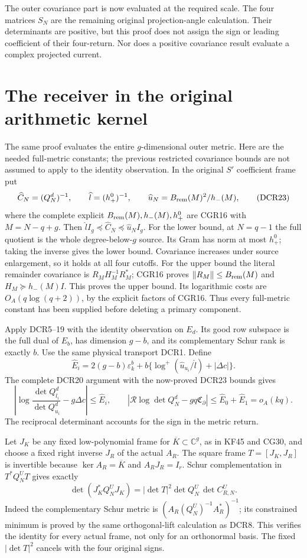 \documentclass[11pt]{article}
\newcommand{\C}{\mathbb C}
\newcommand{\lp}{\log^+}
\begin{document}
The outer covariance part is now evaluated at the required scale.
The four matrices \(S_N\) are the remaining original projection-angle
calculation. Their determinants are positive, but this proof does
not assign the sign or leading coefficient of their four-return.
Nor does a positive covariance result evaluate a complex projected
current.

\section{The receiver in the original arithmetic kernel}

The same proof evaluates the entire \(g\)-dimensional outer metric.
Here are the needed full-metric constants; the previous restricted
covariance bounds are not assumed to apply to the identity observation.
In the original \(S'\) coefficient frame put
\[
\widehat C_N=(Q_N^d)^{-1},\qquad
\widehat l=(h_+^0)^{-1},\qquad
\widehat u_N=B_{\rm rem}(M)^2/h_-(M),
\tag{DCR23}
\]
where the complete explicit \(B_{\rm rem}(M),h_-(M),h_+^0\)
are CGR16 with \(M=N-q+g\). Then
\(\widehat l I_g\preceq\widehat C_N
\preceq\widehat u_N I_g\).
For the lower bound, at \(N=q-1\) the full quotient is the whole
degree-below-\(g\) source. Its Gram has norm at most \(h_+^0\);
taking the inverse gives the lower bound. Covariance increases
under source enlargement, so it holds at all four cutoffs.
For the upper bound the literal remainder covariance is
\(R_MH_M^{-1}R_M^*\); CGR16 proves
\(\|R_M\|\le B_{\rm rem}(M)\) and \(H_M\succeq h_-(M)I\).
This proves the upper bound. Its logarithmic costs are
\(O_A(q\log(q+2))\), by the explicit factors of CGR16.
Thus every full-metric constant has been supplied before deleting
a primary component.

Apply DCR5--19 with the identity observation on \(E_d\).
Its good row subspace is the full dual of \(E_b\), has dimension
\(g-b\), and its complementary Schur rank is exactly \(b\).
Use the same physical transport DCR1. Define
\[
\widehat E_i=
 2(g-b)\varepsilon_k^b+
 b\{\lp(\widehat u_{u_i}/\widehat l)+|\Delta c|\}.
\]
The complete DCR20 argument with the now-proved DCR23 bounds gives
\[
\left|\log\frac{\det Q_{l_i}^d}{\det Q_{u_i}^d}
                         -g\Delta c\right|\le\widehat E_i,
\qquad
\left|\mathcal R\log\det Q_N^d-gq\mathfrak C_\partial\right|
 \le\widehat E_0+\widehat E_1=o_A(kq).
\tag{DCR24}
\]
The reciprocal determinant accounts for the sign in the metric return.

Let \(J_K\) be any fixed low-polynomial frame for
\(\overline K\subset\C^g\), as in KF45 and CG30, and choose a
fixed right inverse \(J_R\) of the actual \(A_R\).
The square frame \(T=[J_K,J_R]\) is invertible because
\(\ker A_R=\overline K\) and \(A_RJ_R=I_r\).
Schur complementation in \(T^*Q_N^UT\) gives exactly
\[
 \det(J_K^*Q_N^UJ_K)
   =|\det T|^2\det Q_N^U\,\det C_{R,N}^U .
\tag{DCR25}
\]
Indeed the complementary Schur metric is
\((A_R(Q_N^U)^{-1}A_R^*)^{-1}\); its constrained minimum is
proved by the same orthogonal-lift calculation as DCR8.
This verifies the identity for every actual frame, not only for
an orthonormal basis. The fixed \(|\det T|^2\) cancels with the
four original signs.
\end{document}
